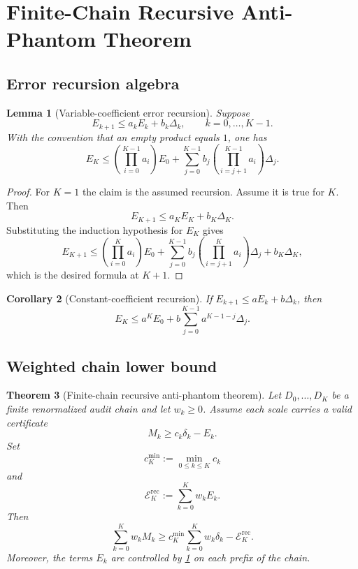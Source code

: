 \documentclass[11pt]{article}
\numberwithin{equation}{section}
\theoremstyle{plain}
\newtheorem{theorem}{Theorem}[section]
\newtheorem{lemma}[theorem]{Lemma}
\newtheorem{corollary}[theorem]{Corollary}
\theoremstyle{definition}
\theoremstyle{remark}
\begin{document}
\section{Finite-Chain Recursive Anti-Phantom Theorem}
\label{sec:finite-chain-recursive}

\subsection{Error recursion algebra}

\begin{lemma}[Variable-coefficient error recursion]\label{lem:var-recursion}
Suppose
\[
  E_{k+1}\le a_kE_k+b_k\Delta_k,\qquad k=0,\dots,K-1.
\]
With the convention that an empty product equals \(1\), one has
\[
  E_K
  \le
  \left(\prod_{i=0}^{K-1}a_i\right)E_0
  +
  \sum_{j=0}^{K-1}
  b_j
  \left(\prod_{i=j+1}^{K-1}a_i\right)
  \Delta_j .
\]
\end{lemma}

\begin{proof}
For \(K=1\) the claim is the assumed recursion.  Assume it is true for \(K\).
Then
\[
  E_{K+1}\le a_KE_K+b_K\Delta_K.
\]
Substituting the induction hypothesis for \(E_K\) gives
\[
  E_{K+1}
  \le
  \left(\prod_{i=0}^{K}a_i\right)E_0
  +
  \sum_{j=0}^{K-1}
  b_j
  \left(\prod_{i=j+1}^{K}a_i\right)\Delta_j
  +b_K\Delta_K,
\]
which is the desired formula at \(K+1\).
\end{proof}

\begin{corollary}[Constant-coefficient recursion]\label{cor:const-recursion}
If \(E_{k+1}\le aE_k+b\Delta_k\), then
\[
  E_K\le a^K E_0+b\sum_{j=0}^{K-1}a^{K-1-j}\Delta_j.
\]
\end{corollary}

\subsection{Weighted chain lower bound}

\begin{theorem}[Finite-chain recursive anti-phantom theorem]\label{thm:finite-chain}
Let \(D_0,\dots,D_K\) be a finite renormalized audit chain and let
\(w_k\ge0\).  Assume each scale carries a valid certificate
\[
  M_k\ge c_k\delta_k-E_k.
\]
Set
\[
  c_K^{\min}:=\min_{0\le k\le K}c_k
\]
and
\[
  \mathcal E_K^{\mathrm{rec}}:=\sum_{k=0}^K w_kE_k.
\]
Then
\begin{equation}\label{eq:finite-chain-lower}
  \sum_{k=0}^K w_kM_k
  \ge
  c_K^{\min}\sum_{k=0}^K w_k\delta_k
  -
  \mathcal E_K^{\mathrm{rec}}.
\end{equation}
Moreover, the terms \(E_k\) are controlled by \cref{lem:var-recursion} on
each prefix of the chain.
\end{theorem}
\end{document}
